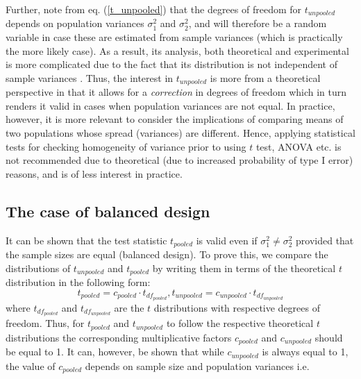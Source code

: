 \documentclass[10pt,final,Twcolumn]{IEEEtran}
\begin{document}
Further, note from eq. (\ref{t_unpooled}) that the degrees of freedom for $t_{unpooled}$ depends on population variances $\sigma_1^2$ and $\sigma_2^2$, and will therefore be a random variable in case these are estimated from sample variances (which is practically the more likely case). As a result, its analysis, both theoretical and experimental is more complicated due to the fact that its distribution is not independent of sample variances \cite{welch}. Thus, the interest in $t_{unpooled}$ is more from a theoretical perspective in that it allows for a {\it{correction}} in degrees of freedom which in turn renders it valid in cases when population variances are not equal. In practice, however, it is more relevant to consider the implications of comparing means of two populations whose spread (variances) are different. Hence, applying statistical tests for checking homogeneity of variance prior to using $t$ test, ANOVA etc. is not recommended due to theoretical (due to increased probability of type I error) reasons, and is of less interest in practice. 

\subsection{The case of balanced design} \label{balanced design}
It can be shown that the test statistic $t_{pooled}$ is valid even if $\sigma_1^2 \neq \sigma_2^2$ provided that the sample sizes are equal (balanced design). To prove this, we compare the distributions of $t_{unpooled}$ and $t_{pooled}$ by writing them in terms of the theoretical $t$ distribution \cite{welch} in the following form:  
\begin{equation}
t_{pooled} = c_{pooled} \cdot t_{df_{pooled}},  t_{unpooled} = c_{unpooled} \cdot t_{df_{unpooled}}
\end{equation}
where $t_{df_{pooled}}$ and $ t_{df_{unpooled}}$ are the $t$ distributions with respective degrees of freedom. Thus, for $t_{pooled}$ and $t_{unpooled}$ to follow the respective theoretical $t$ distributions the corresponding multiplicative factors $c_{pooled}$ and $c_{unpooled}$ should be equal to 1. It can, however, be shown \cite{welch} that while $c_{unpooled} $ is always equal to 1,  the value of $c_{pooled} $ depends on sample size and population variances i.e.
\end{document}

